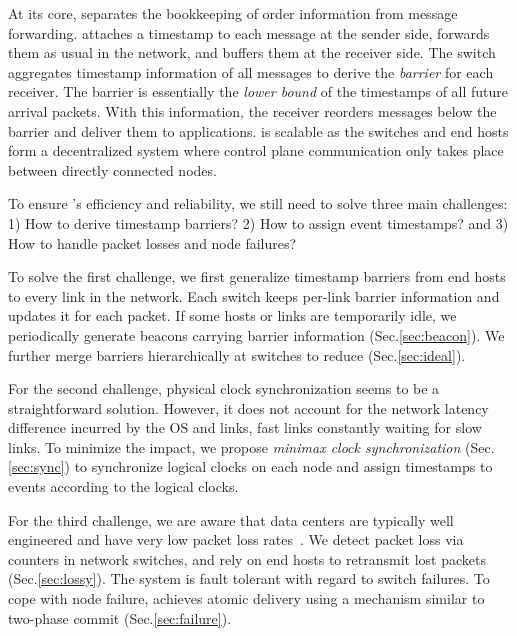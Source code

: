 At its core, \sys separates the bookkeeping of order information from message forwarding.
\sys attaches a timestamp to each message at the sender side, forwards them as usual in the network, and buffers them at the receiver side.
The switch aggregates timestamp information of all messages to derive the \textit{barrier} for each receiver.
The barrier is essentially the \textit{lower bound} of the timestamps of all future arrival packets.
With this information, the receiver reorders messages below the barrier and deliver them to applications.
\sys is scalable as the switches and end hosts form a decentralized system where control plane communication only takes place between directly connected nodes.

To ensure \sys's efficiency and reliability, we still need to solve three main challenges: 1) How to derive timestamp barriers? 2) How to assign event timestamps? and 3) How to handle packet losses and node failures?

To solve the first challenge, we first generalize timestamp barriers from end hosts to every link in the network.
Each switch keeps per-link barrier information and updates it for each packet.
If some hosts or links are temporarily idle, we periodically generate beacons carrying barrier information (Sec.\ref{sec:beacon}).
We further merge barriers hierarchically at switches to reduce  (Sec.\ref{sec:ideal}).

For the second challenge, physical clock synchronization seems to be a straightforward solution.
However, it does not account for the network latency difference incurred by the OS and links,  fast links constantly waiting for slow links.
To minimize the impact, we propose \textit{minimax clock synchronization} (Sec.\ref{sec:sync}) to synchronize logical clocks on each node and assign timestamps to events according to the logical clocks.

For the third challenge, we are aware that data centers are typically well engineered and have very low packet loss rates~\cite{ports2015designing}.
We detect packet loss via counters in network switches, and rely on end hosts to retransmit lost packets (Sec.\ref{sec:lossy}).
The system is fault tolerant with regard to switch failures.
To cope with node failure, \sys achieves atomic delivery using a mechanism similar to two-phase commit (Sec.\ref{sec:failure}).

